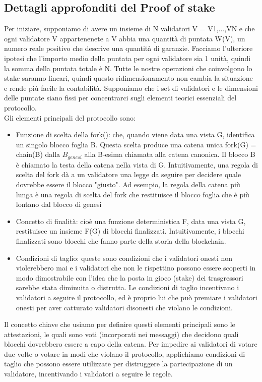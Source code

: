 \documentclass[a4paper,11pt]{report}
\begin{document}
\subsection{Dettagli approfonditi del Proof of stake}
Per iniziare, supponiamo di avere un insieme di N validatori V = {V1,...,VN} e che ogni validatore V appartenenete a  V abbia una quantità di puntata W(V), un numero reale positivo che descrive una quantità di garanzie. Facciamo l'ulteriore ipotesi che l'importo medio della puntata per ogni validatore sia 1 unità, quindi la somma della puntata totale è N. Tutte le nostre operazioni che coinvolgono lo stake saranno lineari, quindi questo ridimensionamento non cambia la situazione e rende più facile la contabilità. Supponiamo che i set di validatori e le dimensioni delle puntate siano fissi per concentrarci sugli elementi teorici essenziali del protocollo.\\
Gli elementi principali del protocollo sono:

\begin{itemize}
\item Funzione di scelta della fork(): che, quando viene data una vista G, identifica un singolo blocco foglia B. Questa scelta produce una catena unica fork(G) = chain(B) dalla $B_{genesi}$  alla B-esima chiamata alla catena canonica. Il blocco B è chiamato la testa della catena nella vista  di G. Intuitivamente, una regola di scelta del fork dà a un validatore una legge da seguire per decidere quale dovrebbe essere il blocco "giusto". Ad esempio, la regola della catena più lunga è una regola di scelta del fork che restituisce il blocco foglia che è più lontano dal blocco di genesi
\item Concetto di finalità: cioè una funzione deterministica F, data una vista G, restituisce un insieme F(G) di  blocchi finalizzati. Intuitivamente, i blocchi finalizzati sono blocchi che fanno parte della storia della blockchain.
\item Condizioni di taglio: queste sono condizioni che i validatori onesti non violerebbero mai e i validatori che non le rispettino possono essere scoperti in modo dimostrabile con l'idea che la posta in gioco (stake) dei trasgressori sarebbe stata diminuita o distrutta. Le condizioni di taglio incentivano i validatori a seguire il protocollo, ed è proprio lui che può premiare i validatori onesti per aver catturato validatori disonesti che violano le condizioni.
\end{itemize}

Il concetto chiave che usiamo per definire questi elementi principali sono le attestazioni, le quali sono voti (incorporati nei messaggi) che decidono quali blocchi dovrebbero essere a capo della catena. Per impedire ai validatori di votare due volte o votare in modi che violano il protocollo, applichiamo condizioni di taglio che possono essere utilizzate per distruggere la partecipazione di un validatore, incentivando i validatori a seguire le regole.
\end{document}

